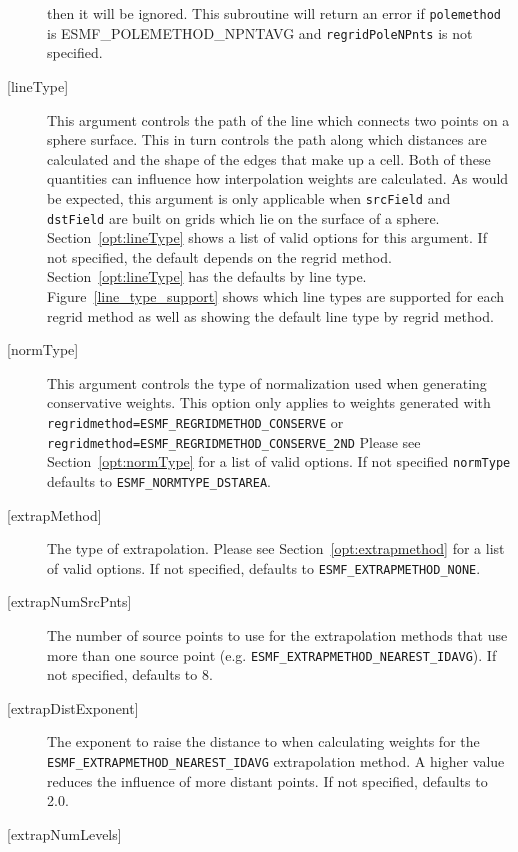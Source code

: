 \begin{description}
             then it will be ignored.  
             This subroutine will return an error if {\tt polemethod} is {ESMF\_POLEMETHOD\_NPNTAVG} and 
             {\tt regridPoleNPnts} is not specified. 
       \item [{[lineType]}]
             This argument controls the path of the line which connects two points on a sphere surface. This in
             turn controls the path along which distances are calculated and the shape of the edges that make
             up a cell. Both of these quantities can influence how interpolation weights are calculated.
             As would be expected, this argument is only applicable when {\tt srcField} and {\tt dstField} are
             built on grids which lie on the surface of a sphere. Section~\ref{opt:lineType} shows a 
             list of valid options for this argument. If not specified, the default depends on the 
             regrid method. Section~\ref{opt:lineType} has the defaults by line type. Figure~\ref{line_type_support} shows
             which line types are supported for each regrid method as well as showing the default line type by regrid method.  
       \item [{[normType]}] 
             This argument controls the type of normalization used when generating conservative weights. This option
             only applies to weights generated with {\tt regridmethod=ESMF\_REGRIDMETHOD\_CONSERVE} or  {\tt regridmethod=ESMF\_REGRIDMETHOD\_CONSERVE\_2ND}
             Please see  Section~\ref{opt:normType} for a 
             list of valid options. If not specified {\tt normType} defaults to {\tt ESMF\_NORMTYPE\_DSTAREA}. 
       \item [{[extrapMethod]}]
             The type of extrapolation. Please see Section~\ref{opt:extrapmethod} 
             for a list of valid options. If not specified, defaults to 
             {\tt ESMF\_EXTRAPMETHOD\_NONE}.
       \item [{[extrapNumSrcPnts]}] 
             The number of source points to use for the extrapolation methods that use more than one source point 
             (e.g. {\tt ESMF\_EXTRAPMETHOD\_NEAREST\_IDAVG}). If not specified, defaults to 8.
       \item [{[extrapDistExponent]}] 
             The exponent to raise the distance to when calculating weights for 
             the {\tt ESMF\_EXTRAPMETHOD\_NEAREST\_IDAVG} extrapolation method. A higher value reduces the influence 
             of more distant points. If not specified, defaults to 2.0.
       \item [{[extrapNumLevels]}] 

\end{description}
